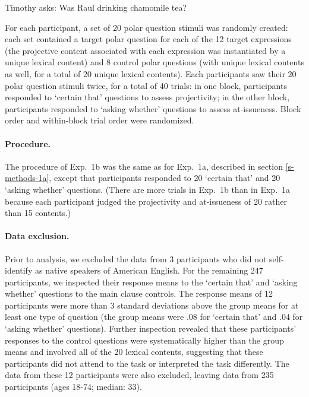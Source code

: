 \documentclass[11pt,fleqn]{article}
\newcommand{\6}{\mbox{$[\hspace*{-.6mm}[$}}
\newcommand{\9}{\mbox{$]\hspace*{-.6mm}]$}}
\begin{document}
\begin{exe}
\ex\label{sample3} Timothy asks: Was Raul drinking chamomile tea?
\end{exe}

For each participant, a set of 20 polar question stimuli was randomly created: each set contained a target polar question for each of the 12 target expressions (the projective content associated with each expression was instantiated by a unique lexical content) and 8 control polar questions (with unique lexical contents as well, for a total of 20 unique lexical contents). Each participants saw their 20 polar question stimuli twice, for a total of 40 trials: in one block, participants responded to `certain that' questions to assess projectivity; in the other block, participants responded to `asking whether' questions to assess at-issueness. Block order and within-block trial order were randomized.

\paragraph{Procedure.} The procedure of Exp.~1b was the same as for Exp.~1a, described in section \ref{s-methods-1a}, except that participants responded to 20 `certain that' and 20 `asking whether' questions. (There are more trials in Exp.~1b than in Exp.~1a because each participant judged the projectivity and at-issueness of 20  rather than 15 contents.)


\paragraph{Data exclusion.} Prior to analysis, we excluded the data from 3 participants who did not self-identify as native speakers of American English. For the remaining 247 participants, we inspected their response means to the `certain that' and `asking whether' questions to the main clause controls. The response means of 12 participants were more than 3 standard deviations above the group means for at least one type of question (the group means were .08 for `certain that' and .04 for `asking whether' questions). Further inspection revealed that these participants' responses to the control questions were systematically higher than the group means and involved all of the 20 lexical contents, suggesting that these participants did not attend to the task or interpreted the task differently. The data from these 12 participants were also excluded, leaving data from 235 participants (ages 18-74; median: 33).
\end{document}

